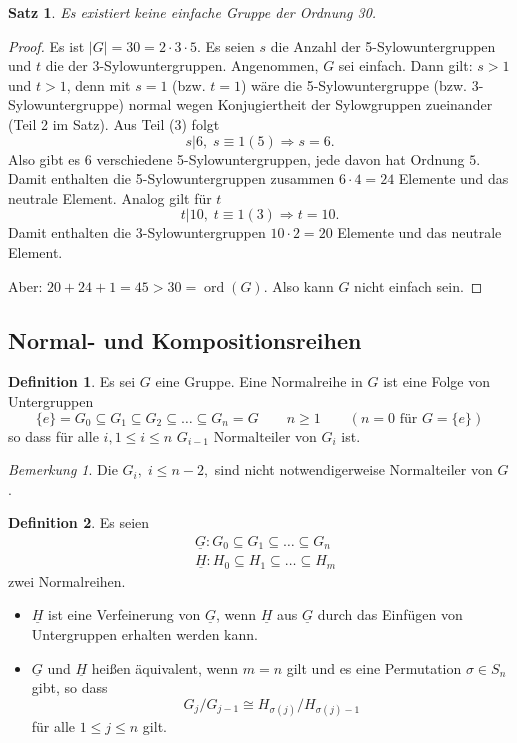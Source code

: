 \documentclass[12pt]{scrartcl} %
\DeclareMathOperator{\ord}{ord}
\newtheorem{thm}{Satz}
\theoremstyle{definition}
\newtheorem*{defn}{Definition}
\theoremstyle{remark}
\newtheorem*{nb}{Bemerkung}
\begin{document}
\begin{thm}
	Es existiert keine einfache Gruppe der Ordnung 30.
\end{thm}

\begin{proof}
	Es ist $|G| = 30 = 2\cdot 3\cdot 5$. Es seien $s$ die Anzahl der 5-Sylowuntergruppen und $t$ die der 3-Sylowuntergruppen. Angenommen, $G$ sei einfach. Dann gilt: $s>1$ und $t>1$, denn mit $s=1$ (bzw. $t=1$) wäre die 5-Sylowuntergruppe (bzw. 3-Sylowuntergruppe) normal wegen Konjugiertheit der Sylowgruppen zueinander (Teil 2 im Satz). Aus Teil (3) folgt
		\[ s|6,\; s\equiv 1(5)\Rightarrow s=6.\]
	Also gibt es 6 verschiedene 5-Sylowuntergruppen, jede davon hat Ordnung $5$. Damit enthalten die 5-Sylowuntergruppen zusammen $6\cdot 4 =24$ Elemente und das neutrale Element. Analog gilt für $t$
		\[ t|10,\; t\equiv 1(3) \Rightarrow t=10.\]
	Damit enthalten die 3-Sylowuntergruppen $10\cdot 2=20$ Elemente und das neutrale Element.
	
	Aber: $20+24+1=45>30=\ord(G)$. Also kann $G$ nicht einfach sein.
\end{proof}

\subsection{Normal- und Kompositionsreihen}

\begin{defn}
	Es sei $G$ eine Gruppe. Eine Normalreihe in $G$ ist eine Folge von Untergruppen
		\[ \{e\} = G_0 \subseteq G_1 \subseteq G_2 \subseteq\dots\subseteq G_n=G\qquad n\geq 1\qquad(n=0\text{ für } G=\{e\})\]
	so dass für alle $i,1\leq i\leq n$ $G_{i-1}$ Normalteiler von $G_i$ ist.
\end{defn}

\begin{nb}
	Die $G_i,\;i\leq n-2,$ sind nicht notwendigerweise Normalteiler von $G$.
\end{nb}

\begin{defn}
	Es seien 
		\[\begin{split}
			&\underline{G}: G_0\subseteq G_1 \subseteq\dots\subseteq G_n \\
			&\underline{H}: H_0\subseteq H_1\subseteq\dots\subseteq H_m 
		\end{split}\]
	zwei Normalreihen.
	\begin{itemize}
		\item $\underline{H}$ ist eine Verfeinerung von $\underline{G}$, wenn $\underline{H}$ aus $\underline{G}$ durch das Einfügen von Untergruppen erhalten werden kann.
		\item $\underline{G}$ und $\underline{H}$ heißen äquivalent, wenn $m=n$ gilt und es eine Permutation $\sigma\in S_n$ gibt, so dass 
		\[ G_j/G_{j-1}\cong H_{\sigma(j)}/H_{\sigma(j)-1}\]
			für alle $1\leq j\leq n$ gilt.
	\end{itemize}
\end{defn}
\end{document}
